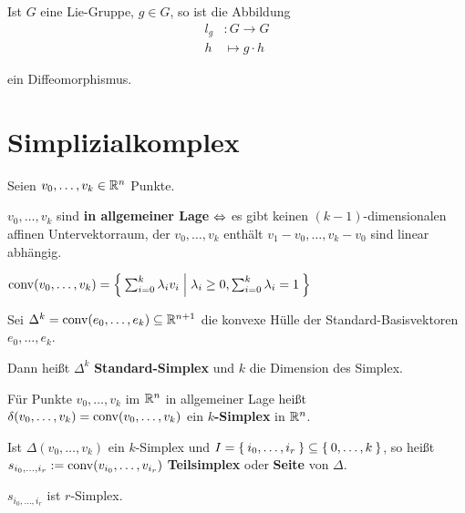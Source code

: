 \begin{bemerkung}
    Ist $G$ eine Lie-Gruppe, $g \in G$, so ist die Abbildung
    \begin{align*}
        l_g &: G \rightarrow G\\
        h  &\mapsto g \cdot h
    \end{align*}

    ein Diffeomorphismus.
\end{bemerkung}

\section{Simplizialkomplex}
\begin{definition}%
    Seien $v_0, \dots, v_k \in \mathbb{R}^n$ Punkte.
    \begin{defenum}
        \item $v_0, \dots, v_k$ sind \textbf{in allgemeiner Lage} $\Leftrightarrow$ es gibt keinen $(k-1)$-dimensionalen
              affinen Untervektorraum, der $v_0, \dots, v_k$ enthält
              \gdw $v_1 - v_0, \dots, v_k - v_0$ sind linear abhängig.
        \item $\operatorname{conv}(v_0, \dots, v_k) = \Set{\sum_{i=0}^k \lambda_i v_i | \lambda_i \geq 0, \sum_{i=0}^k \lambda_i = 1} $
    \end{defenum}
\end{definition}

\begin{definition}
    \begin{defenum}
        \item Sei $\Delta^k = \operatorname{conv}(e_0, \dots, e_k) \subseteq \mathbb{R}^{n+1}$
              die konvexe Hülle der Standard-Basisvektoren $e_0, \dots, e_k$.

              Dann heißt $\Delta^k$ \textbf{Standard-Simplex}
              und $k$ die Dimension des Simplex.
        \item Für Punkte $v_0, \dots, v_k$ im $\mathbb{R}^n$ in allgemeiner
              Lage heißt $\delta (v_0, \dots, v_k) = \operatorname{conv}(v_0, \dots, v_k)$
              ein \textbf{$k$-Simplex} in $\mathbb{R}^n$.
        \item Ist $\Delta (v_0, \dots, v_k)$ ein $k$-Simplex und
              $I = \Set{i_0, \dots, i_r} \subseteq \Set{0, \dots, k}$,
              so heißt $s_{i_0, \dots, i_r} := \operatorname{conv}(v_{i_0}, \dots, v_{i_r})$
              \textbf{Teilsimplex} oder \textbf{Seite}
              von $\Delta$. 

              $s_{i_0, \dots, i_r}$ ist $r$-Simplex.
    \end{defenum}
\end{definition}

